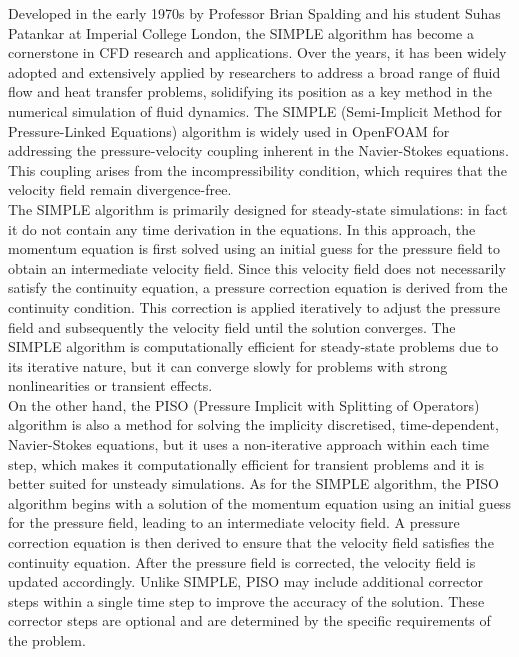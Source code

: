 \documentclass[a5paper]{sapthesis}
\begin{document}
	Developed in the early 1970s by Professor Brian Spalding and his student Suhas Patankar \cite{patankar1980numerical} at Imperial College London, the SIMPLE algorithm has become a cornerstone in CFD research and applications. Over the years, it has been widely adopted and extensively applied by researchers to address a broad range of fluid flow and heat transfer problems, solidifying its position as a key method in the numerical simulation of fluid dynamics.
	The SIMPLE (Semi-Implicit Method for Pressure-Linked Equations) algorithm is widely used in OpenFOAM for addressing the pressure-velocity coupling inherent in the Navier-Stokes equations. This coupling arises from the incompressibility condition, which requires that the velocity field remain divergence-free.
	\\
	The SIMPLE algorithm is primarily designed for steady-state simulations: in fact it do not contain any time derivation in the equations. In this approach, the momentum equation is first solved using an initial guess for the pressure field to obtain an intermediate velocity field. Since this velocity field does not necessarily satisfy the continuity equation, a pressure correction equation is derived from the continuity condition. This correction is applied iteratively to adjust the pressure field and subsequently the velocity field until the solution converges. The SIMPLE algorithm is computationally efficient for steady-state problems due to its iterative nature, but it can converge slowly for problems with strong nonlinearities or transient effects.
	\\
	On the other hand, the PISO (Pressure Implicit with Splitting of Operators) algorithm\cite{ISSA198666} is also a  method for solving the implicity discretised, time-dependent, Navier-Stokes equations, but it uses a non-iterative approach within each time step, which makes it computationally efficient for transient problems and it is better suited for unsteady simulations. As for the SIMPLE algorithm, the PISO algorithm begins with a solution of the momentum equation using an initial guess for the pressure field, leading to an intermediate velocity field. A pressure correction equation is then derived to ensure that the velocity field satisfies the continuity equation. After the pressure field is corrected, the velocity field is updated accordingly. Unlike SIMPLE, PISO may include additional corrector steps within a single time step to improve the accuracy of the solution. These corrector steps are optional and are determined by the specific requirements of the problem.
\end{document}
